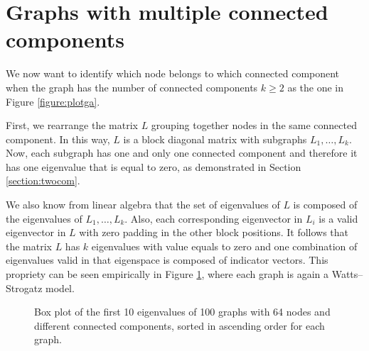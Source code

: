 \documentclass{article}
\begin{document}
\section{Graphs with multiple connected components} \label{section:multiplecom}
We now want to identify which node belongs to which connected component
when the graph has the number of connected components $k \geq 2$
as the one in Figure \ref{figure:plotga}.

First, we rearrange the matrix $L$ grouping together nodes in the same connected component.
In this way, $L$ is a block diagonal matrix with subgraphs $L_1, \dots, L_k$.
Now, each subgraph has one and only one connected component
and therefore it has one eigenvalue that is equal to zero,
as demonstrated in Section \ref{section:twocom}.

We also know from linear algebra that the set of eigenvalues of $L$
is composed of the eigenvalues of $L_1, \dots, L_k$.
Also, each corresponding eigenvector in $L_i$ is a valid eigenvector in $L$ with zero padding
in the other block positions.
It follows that the matrix $L$ has $k$ eigenvalues with value equals to zero and
one combination of eigenvalues valid in that eigenspace is composed of indicator vectors.
This propriety can be seen empirically in Figure \ref{figure:mcomp},
where each graph is again a Watts–Strogatz model.

\begin{figure}[hb]
    \hfill
    \hfill
    \hfill
    \hfill
    \label{figure:mcomp}
    \caption{Box plot of the first 10 eigenvalues of 100 graphs with 64 nodes and different connected components, sorted in ascending order for each graph.}
\end{figure}
\end{document}
